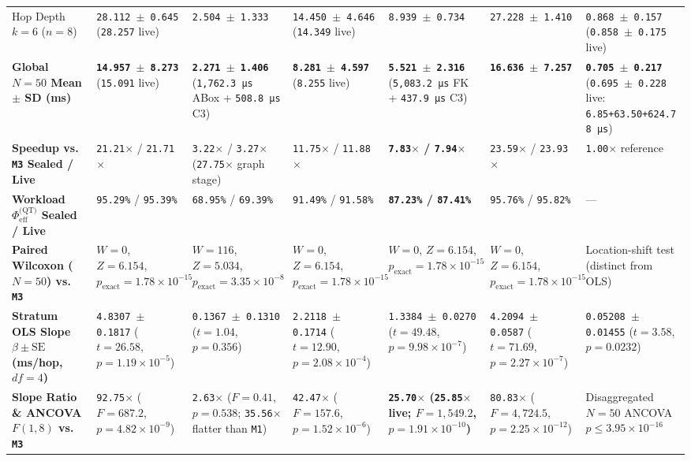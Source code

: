 \documentclass[10pt,a4paper]{article}
\begin{document}
{\begin{longtable}{p{}p{}p{}p{}p{}p{}p{}}
Hop Depth $k = 6$ ($n = 8$) & \texttt{28.112 $\pm$ 0.645} (\texttt{28.257} live) & \texttt{2.504 $\pm$ 1.333} & \texttt{14.450 $\pm$ 4.646} (\texttt{14.349} live) & \texttt{8.939 $\pm$ 0.734} & \texttt{27.228 $\pm$ 1.410} & \texttt{0.868 $\pm$ 0.157} (\texttt{0.858 $\pm$ 0.175} live) \\
\textbf{Global $N = 50$ Mean $\pm$ SD (ms)} & \textbf{\texttt{14.957 $\pm$ 8.273}} (\texttt{15.091} live) & \textbf{\texttt{2.271 $\pm$ 1.406}} (\texttt{1,762.3 µs} ABox + \texttt{508.8 µs} C3) & \textbf{\texttt{8.281 $\pm$ 4.597}} (\texttt{8.255} live) & \textbf{\texttt{5.521 $\pm$ 2.316}} (\texttt{5,083.2 µs} FK + \texttt{437.9 µs} C3) & \textbf{\texttt{16.636 $\pm$ 7.257}} & \textbf{\texttt{0.705 $\pm$ 0.217}} (\texttt{0.695 $\pm$ 0.228} live: \texttt{6.85+63.50+624.78 µs}) \\
\textbf{Speedup vs. \texttt{M3} Sealed / Live} & \texttt{21.21$\times$} / \texttt{21.71$\times$} & \texttt{3.22$\times$} / \texttt{3.27$\times$} (\texttt{27.75$\times$} graph stage) & \texttt{11.75$\times$} / \texttt{11.88$\times$} & \textbf{\texttt{7.83$\times$} / \texttt{7.94$\times$}} & \texttt{23.59$\times$} / \texttt{23.93$\times$} & \texttt{1.00$\times$} reference \\
\textbf{Workload $\Phi_{\text{eff}}^{\text{(QT)}}$ Sealed / Live} & \texttt{95.29\%} / \texttt{95.39\%} & \texttt{68.95\%} / \texttt{69.39\%} & \texttt{91.49\%} / \texttt{91.58\%} & \textbf{\texttt{87.23\%} / \texttt{87.41\%}} & \texttt{95.76\%} / \texttt{95.82\%} & --- \\
\textbf{Paired Wilcoxon ($N = 50$) vs. \texttt{M3}} & $W=0$, $Z=6.154$, $p_{\text{exact}}=1.78\times 10^{-15}$ & $W=116$, $Z=5.034$, $p_{\text{exact}}=3.35\times 10^{-8}$ & $W=0$, $Z=6.154$, $p_{\text{exact}}=1.78\times 10^{-15}$ & $W=0$, $Z=6.154$, $p_{\text{exact}}=1.78\times 10^{-15}$ & $W=0$, $Z=6.154$, $p_{\text{exact}}=1.78\times 10^{-15}$ & Location-shift test (distinct from OLS) \\
\textbf{Stratum OLS Slope $\beta \pm \text{SE}$ (ms/hop, $df=4$)} & \texttt{4.8307 $\pm$ 0.1817} ($t=26.58$, $p=1.19\times 10^{-5}$) & \texttt{0.1367 $\pm$ 0.1310} ($t=1.04$, $p=0.356$) & \texttt{2.2118 $\pm$ 0.1714} ($t=12.90$, $p=2.08\times 10^{-4}$) & \texttt{1.3384 $\pm$ 0.0270} ($t=49.48$, $p=9.98\times 10^{-7}$) & \texttt{4.2094 $\pm$ 0.0587} ($t=71.69$, $p=2.27\times 10^{-7}$) & \texttt{0.05208 $\pm$ 0.01455} ($t=3.58$, $p=0.0232$) \\
\textbf{Slope Ratio \& ANCOVA $F(1,8)$ vs. \texttt{M3}} & \texttt{92.75$\times$} ($F=687.2$, $p=4.82\times 10^{-9}$) & \texttt{2.63$\times$} ($F=0.41$, $p=0.538$; \texttt{35.56$\times$} flatter than \texttt{M1}) & \texttt{42.47$\times$} ($F=157.6$, $p=1.52\times 10^{-6}$) & \textbf{\texttt{25.70$\times$} (\texttt{25.85$\times$} live; $F=1,549.2$, $p=1.91\times 10^{-10}$)} & \texttt{80.83$\times$} ($F=4,724.5$, $p=2.25\times 10^{-12}$) & Disaggregated $N=50$ ANCOVA $p \le 3.95\times 10^{-16}$ \\
\bottomrule
\end{longtable}
}
\end{document}

